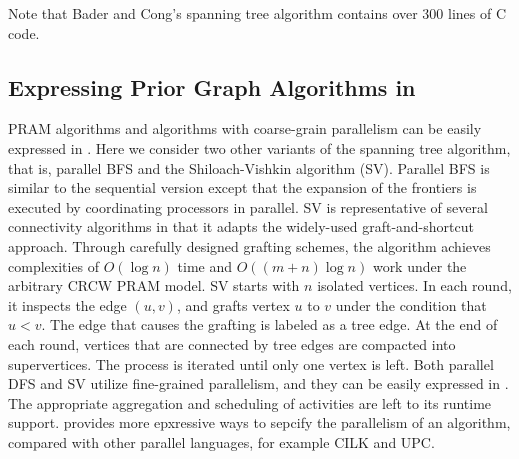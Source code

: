 {%

Note that Bader and Cong's spanning tree algorithm contains over 300 lines of C code.

\subsection{Expressing Prior Graph Algorithms in \Xten{}}

PRAM algorithms and algorithms with coarse-grain parallelism can be easily expressed in \Xten{}. Here we consider two other variants of the spanning tree algorithm, that is, parallel BFS and the Shiloach-Vishkin algorithm (SV).  Parallel BFS is similar to the sequential version except that the expansion of the frontiers is executed by coordinating processors in parallel. SV is representative of several connectivity algorithms in that it adapts the widely-used
graft-and-shortcut approach. Through carefully designed grafting
schemes, the algorithm achieves complexities of $O(\log n)$ time and
$O((m+n)\log n)$ work under the arbitrary CRCW PRAM model. SV starts with $n$ isolated vertices. In each round, it inspects the edge $(u,v)$, and grafts vertex $u$ to $v$ under the condition that $u<v$. The edge that causes the grafting is labeled as a tree edge. At the end of each round, vertices that are connected by tree edges are compacted into supervertices. The process is iterated until only one vertex is left. Both parallel DFS and SV utilize fine-grained parallelism, and they can be easily expressed in \Xten{}. The appropriate aggregation and scheduling of activities are left to its runtime support. \Xten{} provides more epxressive ways to sepcify the parallelism of an algorithm, compared with other parallel languages, for example CILK and UPC.



}
